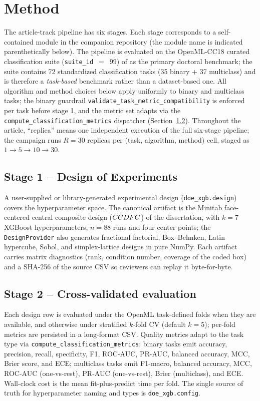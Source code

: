 \section{Method}\label{sec:method}

The article-track pipeline has six stages. Each stage corresponds to a
self-contained module in the companion repository (the module name is
indicated parenthetically below). The pipeline is evaluated on the
OpenML-CC18 curated classification suite
(\texttt{suite\_id}~$=$~99) of \citet{bischl2021openmlbenchmark} as
the primary doctoral benchmark; the suite contains 72 standardized
classification tasks (35 binary + 37 multiclass) and is therefore a
\emph{task-based} benchmark rather than a dataset-based one. All
algorithm and method choices below apply uniformly to binary and
multiclass tasks; the binary guardrail
\texttt{validate\_task\_metric\_compatibility} is enforced per task
before stage 1, and the metric set adapts via the
\texttt{compute\_classification\_metrics} dispatcher
(Section~\ref{sec:method-cv}). Throughout the article, ``replica''
means one independent execution of the full six-stage pipeline; the
campaign runs $R{=}30$ replicas per (task, algorithm, method) cell,
staged as $1\!\to\!5\!\to\!10\!\to\!30$.

\subsection{Stage 1 -- Design of Experiments}
\label{sec:method-doe}
A user-supplied or library-generated experimental design
(\texttt{doe\_xgb.design}) covers the hyperparameter space. The
canonical artifact is the Minitab face-centered central composite
design ($CCDFC$) of the dissertation, with $k{=}7$ XGBoost
hyperparameters, $n{=}88$ runs and four center points; the
\texttt{DesignProvider} also generates fractional factorial,
Box--Behnken, Latin hypercube, Sobol, and simplex-lattice designs
in pure NumPy. Each artifact carries matrix diagnostics (rank,
condition number, coverage of the coded box) and a SHA-256 of the
source CSV so reviewers can replay it byte-for-byte.

\subsection{Stage 2 -- Cross-validated evaluation}
\label{sec:method-cv}
Each design row is evaluated under the OpenML task-defined folds when
they are available, and otherwise under stratified $k$-fold CV
(default $k{=}5$); per-fold metrics are persisted in a long-format
CSV. Quality metrics adapt to the task type via
\texttt{compute\_classification\_metrics}: binary tasks emit
accuracy, precision, recall, specificity, F1, ROC-AUC, PR-AUC,
balanced accuracy, MCC, Brier score, and ECE; multiclass tasks emit
F1-macro, balanced accuracy, MCC, ROC-AUC (one-vs-rest), PR-AUC
(one-vs-rest), Brier (multiclass), and ECE. Wall-clock cost is the
mean fit-plus-predict time per fold. The single source of truth for
hyperparameter naming and types is \texttt{doe\_xgb.config}.

